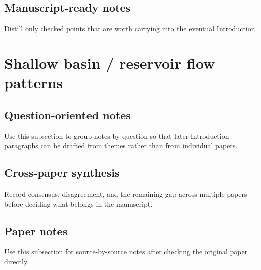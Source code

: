 \documentclass[11pt]{article}
\begin{document}
\subsection{Manuscript-ready notes}
Distill only checked points that are worth carrying into the eventual Introduction.
%

\section{Shallow basin / reservoir flow patterns}

\subsection{Question-oriented notes}
Use this subsection to group notes by question so that later Introduction paragraphs can be drafted from themes rather than from individual papers.
%

\subsection{Cross-paper synthesis}
Record consensus, disagreement, and the remaining gap across multiple papers before deciding what belongs in the manuscript.

\subsection{Paper notes}
Use this subsection for source-by-source notes after checking the original paper directly.
%
\end{document}
